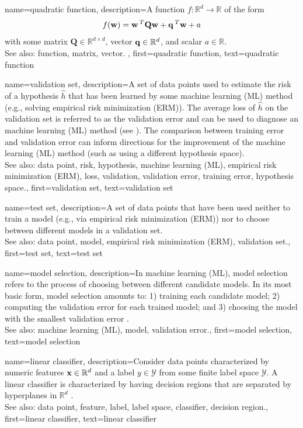 {
{name={quadratic function},
	description={A function $f: \mathbb{R}^{d} \rightarrow \mathbb{R}$ of the form 
		$$f({\bf w}) =  {\bf w}\,^{T} \mathbf{Q} \mathbf{w} + \mathbf{q}\,^{T} {\bf w}+a$$ with 
		some matrix $\mathbf{Q} \in \mathbb{R}^{d \times d}$, vector ${\bf q} \in \mathbb{R}^{d}$, 
		and scalar $a \in \mathbb{R}$.
		\\
		See also: function, matrix, vector. },
	first={quadratic function},
	text={quadratic function}  
}

{name={validation set},
 	description={A set of data points used to estimate 
  		the risk of a hypothesis $\hat{h}$ that has been learned by some 
  		machine learning (ML) method (e.g., solving empirical risk minimization (ERM)). The average loss of $\hat{h}$ 
  		on the validation set is referred to as the validation error and can be used to diagnose an 
  		machine learning (ML) method (see \cite[Sec. 6.6]{MLBasics}). The comparison between training error 
  		and validation error can inform directions for the improvement of the machine learning (ML) method (such as 
  		using a different hypothesis space).
			\\
		See also: data point, risk, hypothesis, machine learning (ML), empirical risk minimization (ERM), loss, validation, validation error, training error, hypothesis space.},
	first={validation set},
	text={validation set}  
}

{name={test set},
	description={A set of data points that have  
		been used neither to train a model (e.g., via empirical risk minimization (ERM)) nor 
		to choose between different models in a validation set.
				\\
		See also: data point, model, empirical risk minimization (ERM), validation set.},
	first={test set},
	text={test set}  
}


{name={model selection},
	description={In machine learning (ML), model selection refers to the 
		process of choosing between different candidate models. In its most 
		basic form, model selection amounts to: 1) training each candidate model; 
		2) computing the validation error for each trained model; and 3) choosing the model 
		with the smallest validation error \cite[Ch. 6]{MLBasics}. 
				\\
		See also: machine learning (ML), model, validation error.},
	first={model selection},
	text={model selection}  
}


{name={linear classifier}, 
	description={Consider data points characterized by numeric features ${\bf x} \in \mathbb{R}^{d}$ 
	    	and a label $y \in \mathcal{Y}$ from some finite label space $\mathcal{Y}$. 
		A linear classifier is characterized by having decision regions that are 
		separated by hyperplanes in $\mathbb{R}^{d}$ \cite[Ch. 2]{MLBasics}.
				\\
		See also: data point, feature, label, label space, classifier, decision region.},
	first={linear classifier},
	text={linear classifier} 
}


}
